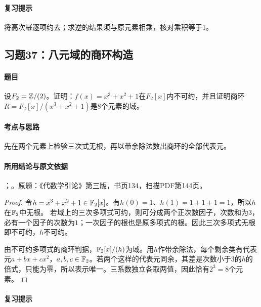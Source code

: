 \paragraph{复习提示}

将高次幂逐项约去；求逆的结果须与原元素相乘，核对乘积等于1。



\subsection{习题37：八元域的商环构造}

\label{ex:3:37}

\paragraph{题目}

设$F_2=\mathbb Z/(2)$。证明：$f(x)=x^3+x^2+1$在$F_2[x]$内不可约，并且证明商环$R=F_2[x]/(x^3+x^2+1)$是$8$个元素的域。

\paragraph{考点与思路}

先在两个元素上检验三次式无根，再以带余除法数出商环的全部代表元。

\paragraph{所用结论与原文依据}

；。原题：《代数学引论》第三版，书页134，扫描PDF第144页。


\begin{proof}

令$h=x^3+x^2+1\in\mathbb F_2[x]$。有$h(0)=1$、$h(1)=1+1+1=1$，所以$h$在$\mathbb F_2$中无根。
若域上的三次多项式可约，则可分成两个正次数因子，次数和为$3$，必有一个因子的次数为$1$；一次因子的根也是原多项式的根。因此三次多项式无根即不可约，$h$不可约。

由不可约多项式的商环判据，$\mathbb F_2[x]/(h)$为域。用$h$作带余除法，每个剩余类有代表元$a+bx+cx^2$，$a,b,c\in\mathbb F_2$。若两个这样的代表元同余，其差是次数小于$3$的$h$的倍式，只能为零，所以表示唯一。三系数独立各取两值，因此恰有$2^3=8$个元素。

\end{proof}

\paragraph{复习提示}

